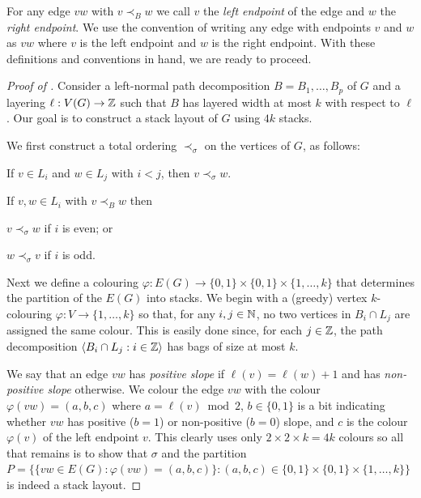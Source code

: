 \documentclass{patmorin}
\begin{document}
For any edge $vw$ with $v\prec_B w$ we call $v$ the \emph{left endpoint} of the edge and $w$ the \emph{right endpoint}.  We use the convention of writing any edge with endpoints $v$ and $w$ as $vw$ where $v$ is the left endpoint and $w$ is the right endpoint.  With these definitions and conventions in hand, we are ready to proceed.

\begin{proof}[Proof of ]
  Consider a left-normal path decomposition $B=B_1,\ldots,B_p$ of $G$ and a layering $\ell:V(G)\to\mathbb{Z}$ such that $B$ has layered width at most $k$ with respect to $\ell$.  Our goal is to construct a stack layout of $G$ using $4k$ stacks.

  We first construct a total ordering $\prec_\sigma$ on the vertices of $G$, as follows:
  \begin{compactenum}[(Property 1)]
    \item If $v\in L_i$ and $w\in L_j$ with $i < j$, then $v\prec_\sigma w$.
    \item If $v,w\in L_i$ with $v \prec_B w$ then
    \begin{compactenum}[(a)]
      \item $v\prec_\sigma w$ if $i$ is even; or
      \item $w\prec_\sigma v$ if $i$ is odd.
    \end{compactenum}
  \end{compactenum}

  Next we define a colouring $\varphi:E(G)\to\{0,1\}\times\{0,1\}\times\{1,\ldots,k\}$ that determines the partition of the $E(G)$ into stacks.  We begin with a (greedy) vertex $k$-colouring $\varphi:V\to \lbrace 1,\ldots,k\rbrace$ so that, for any $i,j\in\mathbb{N}$, no two vertices in $B_i\cap L_j$ are assigned the same colour. This is easily done since, for each $j\in\mathbb{Z}$, the path decomposition $\langle B_i\cap L_j : i\in \mathbb{Z}\rangle$ has bags of size at most $k$.

  We say that an edge $vw$ has \emph{positive slope} if $\ell(v)=\ell(w)+1$ and has \emph{non-positive slope} otherwise.  We colour the edge $vw$ with the colour $\varphi(vw)=(a,b,c)$ where $a=\ell(v)\bmod 2$, $b\in\{0,1\}$ is a bit indicating whether $vw$ has positive ($b=1$) or non-positive ($b=0$) slope, and $c$ is the colour $\varphi(v)$ of the left endpoint $v$.  This clearly uses only $2\times2\times k=4k$ colours so all that remains is to show that
  $\sigma$ and the partition $P=\{\{vw\in E(G):\varphi(vw)=(a,b,c)\}:(a,b,c)\in \{0,1\}\times\{0,1\}\times\{1,\ldots,k\}\}$  is indeed a stack layout.


\end{proof}
\end{document}
